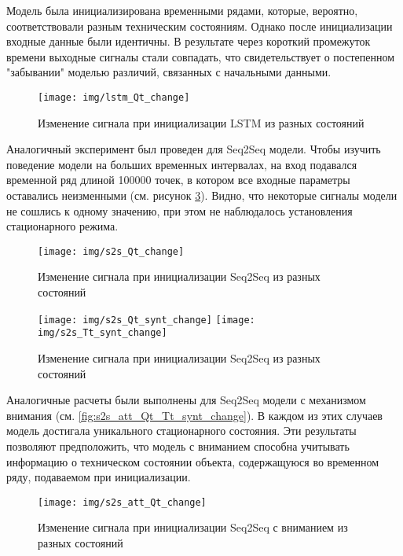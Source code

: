 \documentclass[12pt,a4paper]{article}
\begin{document}
Модель была инициализирована временными рядами, которые, вероятно, соответствовали разным техническим состояниям. Однако после инициализации входные данные были идентичны. В результате через короткий промежуток времени выходные сигналы стали совпадать, что свидетельствует о постепенном "забывании" моделью различий, связанных с начальными данными.

\begin{figure}[htbp]
	\centering\texttt{[image: img/lstm\_Qt\_change]}
	\caption{Изменение сигнала при инициализации LSTM из разных состояний}
	\label{fig:lstm_Qt_change}
\end{figure}

Аналогичный эксперимент был проведен для Seq2Seq модели. Чтобы изучить поведение модели на больших временных интервалах, на вход подавался временной ряд длиной 100000 точек, в котором все входные параметры оставались неизменными (см. рисунок \ref{fig:s2s_Qt_Tt_synt_change}).  Видно, что некоторые сигналы модели не сошлись к одному значению, при этом не наблюдалось установления стационарного режима.


\begin{figure}[htbp]
	\centering\texttt{[image: img/s2s\_Qt\_change]}
	\caption{Изменение сигнала при инициализации Seq2Seq из разных состояний}
	\label{fig:s2s_Qt_change}
\end{figure}

\begin{figure}[htbp]
	\centering\texttt{[image: img/s2s\_Qt\_synt\_change]}
	\centering\texttt{[image: img/s2s\_Tt\_synt\_change]}
	\caption{Изменение сигнала при инициализации Seq2Seq из разных состояний}
	\label{fig:s2s_Qt_Tt_synt_change}
\end{figure}

Аналогичные расчеты были выполнены для Seq2Seq модели с механизмом внимания (см.  \ref{fig:s2s_att_Qt_Tt_synt_change}). В каждом из этих случаев модель достигала уникального стационарного состояния. Эти результаты позволяют предположить, что модель с вниманием способна учитывать информацию о техническом состоянии объекта, содержащуюся во временном ряду, подаваемом при инициализации.


\begin{figure}[htbp]
	\centering\texttt{[image: img/s2s\_att\_Qt\_change]}
	\caption{Изменение сигнала при инициализации Seq2Seq с вниманием из разных состояний}
	\label{fig:s2s_att_Qt_change}
\end{figure}
\end{document}

